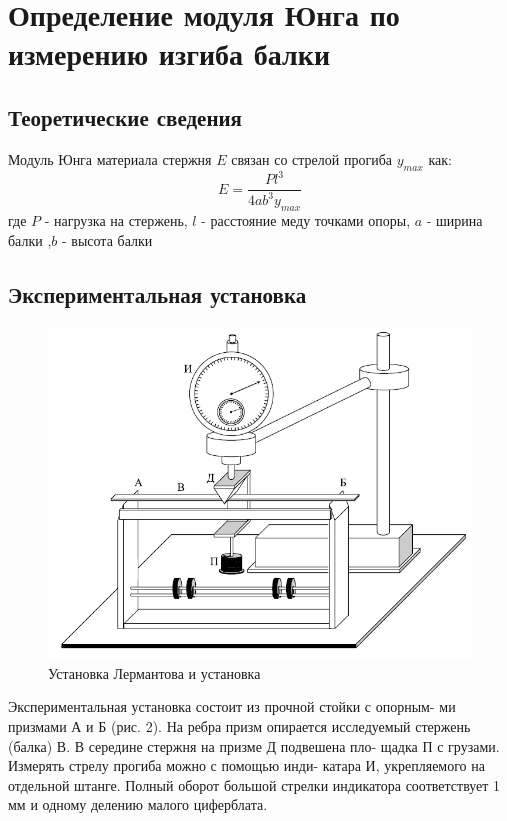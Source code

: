 \documentclass[a4paper,12pt]{article} %
\begin{document}
\section{Определение модуля Юнга по измерению изгиба балки}

\subsection{Теоретические сведения}
Модуль Юнга материала стержня $E$ связан со стрелой прогиба $y_{max}$ как:
\begin{equation}\label{balka}
    E=\frac{Pl^3}{4ab^3y_{max}}
\end{equation}
где $P$ - нагрузка на стержень, $l$ - расстояние меду точками опоры,
$a$ - ширина балки ,$b$ - высота балки

\subsection{Экспериментальная установка}

\begin{figure}[!ht]
    \centering
    \includegraphics[scale=1]{pictures/balka.png}
    \caption{Установка Лермантова и установка}
\end{figure}

Экспериментальная установка состоит из прочной стойки с опорным-
ми призмами А и Б (рис. 2). На ребра призм опирается исследуемый
стержень (балка) В. В середине стержня на призме Д подвешена пло-
щадка П с грузами. Измерять стрелу прогиба можно с помощью инди-
катара И, укрепляемого на отдельной штанге. Полный оборот большой
стрелки индикатора соответствует 1 мм и одному делению малого циферблата.
\end{document}
